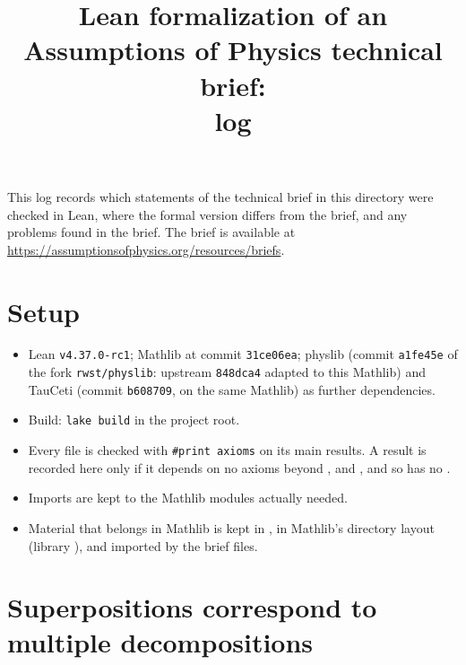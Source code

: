 \documentclass[11pt]{article}
\title{Lean formalization of an Assumptions of Physics technical brief:\\ log}
\author{}
\date{}
\begin{document}
\maketitle

\noindent
This log records which statements of the technical brief in this directory were checked in Lean,
where the formal version differs from the brief, and any problems found in the brief.
The brief is available at \url{https://assumptionsofphysics.org/resources/briefs}.

\section*{Setup}

\begin{itemize}
\item Lean \texttt{v4.37.0-rc1}; Mathlib at commit \texttt{31ce06ea}; physlib (commit \texttt{a1fe45e}
  of the fork \texttt{rwst/physlib}: upstream \texttt{848dca4} adapted to this Mathlib) and
  TauCeti (commit \texttt{b608709}, on the same Mathlib) as further dependencies.
\item Build: \texttt{lake build} in the project root.
\item Every file is checked with \texttt{\#print axioms} on its main results. A result is
  recorded here only if it depends on no axioms beyond ,
   and , and so has no .
\item Imports are kept to the Mathlib modules actually needed.
\item Material that belongs in Mathlib is kept in , in Mathlib's directory
  layout (library ), and imported by the brief files.
\end{itemize}



\section{Superpositions correspond to multiple decompositions}
\end{document}
